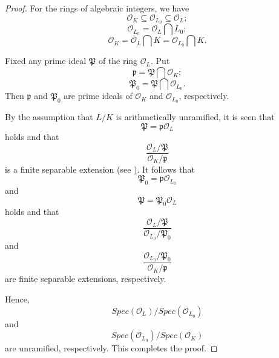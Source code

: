 \documentclass{amsart}
\theoremstyle{definition}
\numberwithin{equation}{section}
\begin{document}
\begin{proof}
For the rings of algebraic integers, we have
\begin{equation*}
\mathcal{O}_{K}\subseteq \mathcal{O}_{L_{0}}\subseteq \mathcal{O}_{L};
\end{equation*}
\begin{equation*}
\mathcal{O}_{L_{0}}=\mathcal{O}_{L}\bigcap L_{0};
\end{equation*}
\begin{equation*}
\mathcal{O}_{K}=\mathcal{O}_{L}\bigcap K=\mathcal{O}_{L_{0}}\bigcap K.
\end{equation*}

Fixed any prime ideal $\mathfrak{P}$ of the ring $\mathcal{O}_{L}$. Put
\begin{equation*}
\mathfrak{p}=\mathfrak{P}\bigcap \mathcal{O}_{K};
\end{equation*}
\begin{equation*}
\mathfrak{P}_{0}=\mathfrak{P}\bigcap \mathcal{O}_{L_{0}}.
\end{equation*}
Then $\mathfrak{p}$ and $\mathfrak{P}_{0}$ are prime ideals of $\mathcal{O}_{K}$ and $\mathcal{O}_{L_{0}}$, respectively.

By the assumption that $L/K$ is arithmetically unramified, it is seen that
\begin{equation*}
\mathfrak{P}=\mathfrak{p}\mathcal{O}_{L}
\end{equation*}
holds and that
\begin{equation*}
\frac{\mathcal{O}_{L}/\mathfrak{P}}{\mathcal{O}_{K}/\mathfrak{p}}
\end{equation*}
is a finite separable extension (see \cite{f-k,sga1,mln}). It follows that
\begin{equation*}
\mathfrak{P}_{0}=\mathfrak{p}\mathcal{O}_{L_{0}}
\end{equation*}
and
\begin{equation*}
\mathfrak{P}=\mathfrak{P}_{0}\mathcal{O}_{L}
\end{equation*}
holds and that
\begin{equation*}
\frac{\mathcal{O}_{L}/\mathfrak{P}}{\mathcal{O}_{L_{0}}/\mathfrak{P}_{0}}
\end{equation*}
and
\begin{equation*}
\frac{\mathcal{O}_{L_{0}}/\mathfrak{P}_{0}}{\mathcal{O}_{K}/\mathfrak{p}}
\end{equation*}
are finite separable extensions, respectively.

Hence,
\begin{equation*}
Spec(\mathcal{O}_{L})/Spec(\mathcal{O}_{L_{0}})
\end{equation*}
and
\begin{equation*}
Spec(\mathcal{O}_{L_{0}})/Spec(\mathcal{O}_{K})
\end{equation*}
are unramified, respectively. This completes the proof.
\end{proof}
\end{document}

